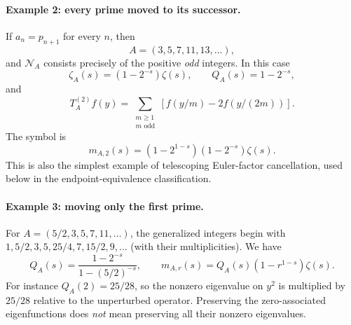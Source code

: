 \documentclass[12pt,letterpaper]{article}
\numberwithin{equation}{section}
\theoremstyle{remark}
\begin{document}
\paragraph{Example 2: every prime moved to its successor.}
If $a_n=p_{n+1}$ for every $n$, then
\[
 A=(3,5,7,11,13,\ldots),
\]
and $\mathcal N_A$ consists precisely of
the positive \emph{odd} integers.  In this case
\[
 \zeta_A(s)=(1-2^{-s})\zeta(s),\qquad Q_A(s)=1-2^{-s},
\]
and
\begin{equation}\label{eq:oddTA}
 T_A^{(2)}f(y)=\sum_{\substack{m\ge1\\m\text{ odd}}}
 \left[f(y/m)-2f(y/(2m))\right].
\end{equation}
The symbol is
\[
 m_{A,2}(s)=(1-2^{1-s})(1-2^{-s})\zeta(s).
\]
This is also the simplest example of telescoping Euler-factor
cancellation, used below in the endpoint-equivalence classification.

\paragraph{Example 3: moving only the first prime.}
For $A=(5/2,3,5,7,11,\ldots)$, the generalized integers begin with
$1,5/2,3,5,25/4,7,15/2,9,\ldots$ (with their multiplicities).  We have
\begin{equation}\label{eq:oneprime}
 Q_A(s)=\frac{1-2^{-s}}{1-(5/2)^{-s}},\qquad
 m_{A,r}(s)=Q_A(s)(1-r^{1-s})\zeta(s).
\end{equation}
For instance $Q_A(2)=25/28$, so the nonzero eigenvalue on $y^2$
is multiplied by $25/28$ relative to the unperturbed operator.
Preserving the zero-associated eigenfunctions does \emph{not} mean
preserving all their nonzero eigenvalues.
\end{document}
